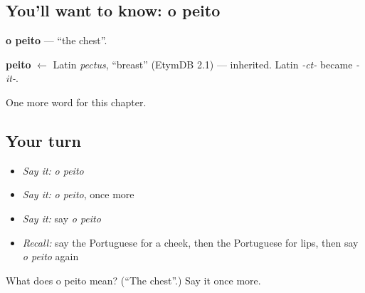 \subsection*{You'll want to know: o peito}
\textbf{o peito} — \textquotedblleft{}the chest\textquotedblright{}.

\begin{cousinweb}
\textbf{peito} $\leftarrow$ Latin \emph{pectus}, \textquotedblleft{}breast\textquotedblright{} (EtymDB 2.1) — inherited. Latin \emph{-ct-} became \emph{-it-}.
\end{cousinweb}

\begin{grammarlens}[title={What you've built}]
One more word for this chapter.
\end{grammarlens}

\subsection*{Your turn}
\begin{itemize}
\raggedright
  \item \emph{Say it:} \emph{o peito}
  \item \emph{Say it:} \emph{o peito}, once more
  \item \emph{Say it:} say \emph{o peito}
  \item \emph{Recall:} say the Portuguese for a cheek, then the Portuguese for lips, then say \emph{o peito} again
\end{itemize}

\begin{tcolorbox}[breakable,colback=teal!4,colframe=teal!35!black,title={Before you move on}]
What does o peito mean? (\textquotedblleft{}The chest\textquotedblright{}.) Say it once more.
\end{tcolorbox}
